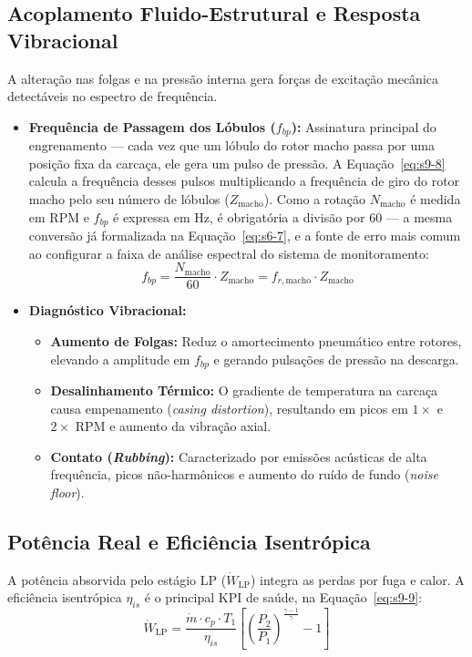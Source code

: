 \documentclass[12pt,a4paper]{article}
\numberwithin{equation}{section}
\numberwithin{table}{section}
\numberwithin{figure}{section}
\begin{document}
	\subsection{\textbf{Acoplamento Fluido-Estrutural e Resposta Vibracional}}
	A alteração nas folgas e na pressão interna gera forças de excitação mecânica detectáveis no espectro de frequência.
	\begin{itemize}
		\item \textbf{Frequência de Passagem dos Lóbulos ($f_{bp}$):} Assinatura principal do engrenamento — cada vez que um lóbulo do rotor macho passa por uma posição fixa da carcaça, ele gera um pulso de pressão. A Equação~\eqref{eq:s9-8} calcula a frequência desses pulsos multiplicando a frequência de giro do rotor macho pelo seu número de lóbulos ($Z_{\text{macho}}$). Como a rotação $N_{\text{macho}}$ é medida em RPM e $f_{bp}$ é expressa em Hz, é obrigatória a divisão por 60 — a mesma conversão já formalizada na Equação~\eqref{eq:s6-7}, e a fonte de erro mais comum ao configurar a faixa de análise espectral do sistema de monitoramento:
		\begin{equation}\label{eq:s9-8}
 f_{bp} = \frac{N_{\text{macho}}}{60} \cdot Z_{\text{macho}} = f_{r,\text{macho}} \cdot Z_{\text{macho}}
\end{equation}
		\item \textbf{Diagnóstico Vibracional:}
		\begin{itemize}
			\item \textbf{Aumento de Folgas:} Reduz o amortecimento pneumático entre rotores, elevando a amplitude em $f_{bp}$ e gerando pulsações de pressão na descarga.
			\item \textbf{Desalinhamento Térmico:} O gradiente de temperatura na carcaça causa empenamento (\textit{casing distortion}), resultando em picos em $1 \times$ e $2 \times$ RPM e aumento da vibração axial.
			\item \textbf{Contato (\textit{Rubbing}):} Caracterizado por emissões acústicas de alta frequência, picos não-harmônicos e aumento do ruído de fundo (\textit{noise floor}).
		\end{itemize}
	\end{itemize}
	
	\subsection{\textbf{Potência Real e Eficiência Isentrópica}}
	A potência absorvida pelo estágio LP ($\dot{W}_{\text{LP}}$) integra as perdas por fuga e calor. A eficiência isentrópica $\eta_{is}$ é o principal KPI de saúde, na Equação~\eqref{eq:s9-9}:
	\begin{equation}\label{eq:s9-9}
 \dot{W}_{\text{LP}} = \frac{\dot{m} \cdot c_p \cdot T_1}{\eta_{is}} \left[ \left( \frac{P_2}{P_1} \right)^{\frac{\gamma - 1}{\gamma}} - 1 \right] 
\end{equation}
	
\end{document}

